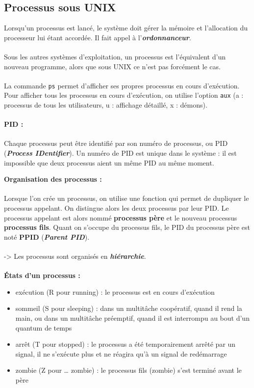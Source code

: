 	\subsection{Processus sous UNIX}
		\begin{frame}[containsverbatim]
			Lorsqu'un processus est lancé, le système doit gérer la mémoire et l'allocation du processeur lui étant accordée. Il fait appel à l'\textit{\textbf{ordonnanceur}}.
			\\~\\
			Sous les autres systèmes d'exploitation, un processus est l'équivalent d'un nouveau programme, alors que sous UNIX ce n'est pas forcément le cas.
			\\~\\
			La commande \lstinline!ps! permet d'afficher ses propres processus en cours d'exécution. Pour afficher tous les processus en cours d'exécution, on utilise l'option \lstinline!aux! (a : processus de tous les utilisateurs, u : affichage détaillé, x : démons).
			\\~\\
			\textbf{PID :}
			\\~\\
			Chaque processus peut être identifié par son numéro de processus, ou PID (\textbf{\textit{Process IDentifier}}). Un numéro de PID est unique dans le système : il est impossible que deux processus aient un même PID au même moment.
			
		\end{frame}	
		
		\begin{frame}
			\textbf{Organisation des processus :}
			\\~\\
			Lorsque l'on crée un processus, on utilise une fonction qui permet de dupliquer le processus appelant. On distingue alors les deux processus par leur PID. Le processus appelant est alors nommé \textbf{processus père} et le nouveau processus \textbf{processus fils}. Quant on s'occupe du processus fils, le PID du processus père est noté \textbf{PPID} (\textbf{\textit{Parent PID}}).
			\\~\\
			-> Les processus sont organisés en \textbf{\textit{hiérarchie}}.
			\\~\\
			\textbf{États d'un processus :}~\\
			\begin{itemize}
				\item exécution (R pour running) : le processus est en cours d'exécution
				\item sommeil (S pour sleeping) : dans un multitâche coopératif, quand il rend la main, ou dans un multitâche préemptif, quand il est interrompu au bout d'un quantum de temps
				\item arrêt (T pour stopped) : le processus a été temporairement arrêté par un signal, il ne s'exécute plus et ne réagira qu'à un signal de redémarrage
				\item zombie (Z pour … zombie) : le processus fils (zombie) s'est terminé avant le père
			\end{itemize}
		\end{frame}
		
